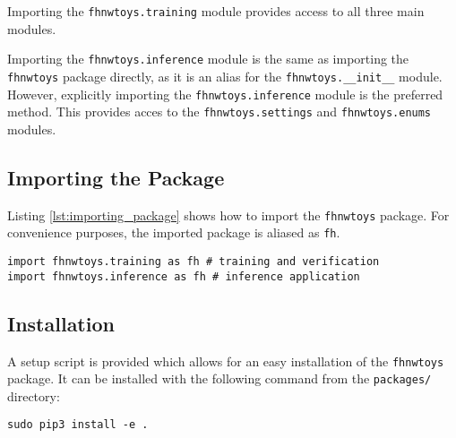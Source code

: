 Importing the \texttt{fhnwtoys.training} module provides access to all three main modules.

Importing the \texttt{fhnwtoys.inference} module is the same as importing the \texttt{fhnwtoys} package directly, as it is an alias for the \texttt{fhnwtoys.\_\_init\_\_} module.
However, explicitly importing the \texttt{fhnwtoys.inference} module is the preferred method.
This provides acces to the \texttt{fhnwtoys.settings} and \texttt{fhnwtoys.enums} modules.

\subsection{Importing the Package}
\label{subsec:inference:package:importing_the_package}
Listing \ref{lst:importing_package} shows how to import the \texttt{fhnwtoys} package.
For convenience purposes, the imported package is aliased as \texttt{fh}.

\begin{lstlisting}[style=python, caption={Importing the \texttt{fhnwtoys} Python package}, label=lst:importing_package]
import fhnwtoys.training as fh # training and verification
import fhnwtoys.inference as fh # inference application
\end{lstlisting}

\subsection{Installation}
\label{subsec:inference:package:installation}
A setup script is provided which allows for an easy installation of the \texttt{fhnwtoys} package.
It can be installed with the following command from the \texttt{packages/} directory:

\begin{lstlisting}[style=bash]
sudo pip3 install -e .
\end{lstlisting}
